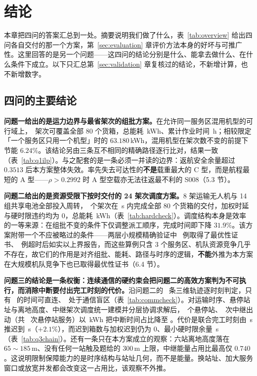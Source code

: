 \section{结论}
\label{sec:conclusion}

本章把四问的答案汇总到一处。摘要说明我们做了什么，表~\ref{tab:overview} 给出四问各自交付的那一个方案，第~\ref{sec:evaluation} 章评价方法本身的好坏与可推广性。这里回答的是另一个问题——这四问的结论分别是什么、能拿去做什么、在什么条件下成立。以下只汇总第~\ref{sec:validation} 章复核过的结论，不新增计算，也不新增数字。

\subsection{四问的主要结论}

\textbf{问题一给出的是运力边界与最省架次的组批方案。}在允许同一服务区混用机型的可行域上，\mtQoneTrips\ 架次可覆盖全部 80 个货箱，总能耗 \mtQoneEnergy\,kWh、累计作业时间 \mtQoneWorkTimeH\,h；相较限定「一个服务区只用一个机型」时的 $63.180$\,kWh，混用机型在架次数不变的前提下节能 $6.24\%$。该结论另由三条互不相同的精确路径逐行比对，结果一致（表~\ref{tab:q1ilp}）。与之配套的是一条必须一并读的边界：返航安全余量超过 $0.3513$ 后本方案整体失效。率先失去可达性的\textbf{不是}载重最大的 C 型，而是航程最短的 A 型——$\rho>0.2992$ 时 A 型空载亦无法往返最不利的 S008（5.3 节）。

\textbf{问题二给出的是资源受限下按时交付的 24 架次调度方案。}8 架运输无人机与 14 组共享电池全部投入周转，\mtQtwoRecTrips\ 个架次在 \mtQtwoMakespan\,s 内完成全部 80 个货箱的交付，加权时延与硬时限违约均为 $0$，总能耗 \mtQtwoEnergy\,kWh（表~\ref{tab:hardcheck}）。调度结构本身是效率的一等来源：在组批不变的条件下仅调整派工顺序，完成时间即下降 $31.9\%$。该方案附带一个不应被略过的条件——两层小规模精确验证中 \mtQtwoExactProved\ 例取得了最优性证书、\mtQtwoExactTimeout\ 例超时后如实以上界报告，而这些算例只含 3 个服务区、机队资源竞争几乎不存在，故它们的作用是对齐组批、能耗、路径与时序的逻辑，\textbf{不能}外推为本方案在大规模机队竞争下也已取得最优性证书（6.4 节）。

\textbf{问题三的结论是一条权衡：连续通信的硬约束会把问题二的高效方案判为不可执行，而消除中断要付出完工时刻的代价。}沿问题二的 \mtQtwoRecTrips\ 条三维轨迹逐时刻判定，只有 \mtQthreeDirect\ 的时间可直连、\mtQthreeRelayFrac\ 处于通信盲区（表~\ref{tab:commcheck}）。对运输时序、悬停站址与离地高度、中继架次调度统一建模并分层协调求解后，\mtQthreeStations\ 个悬停站、\mtQthreeRelays\ 次中继出动（共 \mtQthreeRelayVisits\ 次悬停站服务）以 \mtQthreeRelayEnergy\,kWh 把中断时间占比降至 \mtQthreeGap。代价是联合完工时刻由 \mtQtwoMakespan\,s 推迟到 \mtQthreeJointDone\,s（$+2.1\%$），而迟到箱数与加权迟到仍为 $0$、最小硬时限余量 \mtQthreeMinMarginFine\,s（表~\ref{tab:q3chain}）。还有一条只在本方案成立的观察：六站离地高度落在 $65\sim185$\,m、没有任何一站触及题给的 $300$\,m 上限，中继能量占用比最高仅 $0.740$。这说明限制保障能力的是时序结构与站址几何，而不是能量。换站址、加大服务窗口或放宽并发都会改变这一占用比，该观察不外推。

